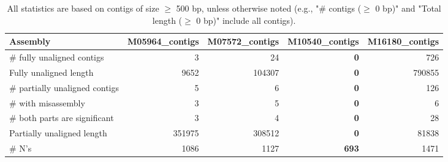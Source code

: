\documentclass[12pt,a4paper]{article}
\begin{document}
\begin{table}[ht]
\begin{center}
\caption{All statistics are based on contigs of size $\geq$ 500 bp, unless otherwise noted (e.g., "\# contigs ($\geq$ 0 bp)" and "Total length ($\geq$ 0 bp)" include all contigs).}
\begin{tabular}{|l*{4}{|r}|}
\hline
Assembly & M05964\_contigs & M07572\_contigs & M10540\_contigs & M16180\_contigs \\ \hline
\# fully unaligned contigs & 3 & 24 & {\bf 0} & 726 \\ \hline
Fully unaligned length & 9652 & 104307 & {\bf 0} & 790855 \\ \hline
\# partially unaligned contigs & 5 & 6 & {\bf 0} & 126 \\ \hline
\hspace{5mm}\# with misassembly & 3 & 5 & {\bf 0} & 6 \\ \hline
\hspace{5mm}\# both parts are significant & 3 & 4 & {\bf 0} & 28 \\ \hline
Partially unaligned length & 351975 & 308512 & {\bf 0} & 81838 \\ \hline
\# N's & 1086 & 1127 & {\bf 693} & 1471 \\ \hline
\end{tabular}
\end{center}
\end{table}
\end{document}
